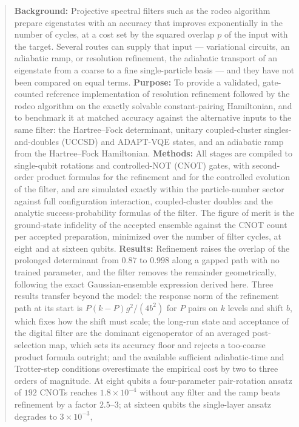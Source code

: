 \documentclass[
  aps,            %
  prc,            %
  reprint,        %
  superscriptaddress,
  floatfix,
  nofootinbib
]{revtex4-2}
\begin{document}
\begin{abstract}
\textbf{Background:} Projective spectral filters such as the rodeo algorithm
prepare eigenstates with an accuracy that improves exponentially in the
number of cycles, at a cost set by the squared overlap $p$ of the input
with the target.  Several routes can supply that input --- variational circuits, an
adiabatic ramp, or resolution refinement, the adiabatic transport of an
eigenstate from a coarse to a fine single-particle basis --- and they have
not been compared on equal terms.
\textbf{Purpose:} To provide a validated, gate-counted reference
implementation of resolution refinement followed by the rodeo algorithm on
the exactly solvable constant-pairing Hamiltonian, and to benchmark it at
matched accuracy against the alternative inputs to the same filter: the
Hartree--Fock determinant, unitary coupled-cluster singles-and-doubles
(UCCSD) and ADAPT-VQE states, and an adiabatic ramp from the Hartree--Fock
Hamiltonian.
\textbf{Methods:} All stages are compiled to single-qubit rotations and
controlled-NOT (CNOT) gates, with second-order product formulas for the
refinement and for the controlled evolution of the filter, and are simulated
exactly within the particle-number sector against full configuration
interaction, coupled-cluster doubles and the analytic success-probability
formulas of the filter.  The figure of merit is the
ground-state infidelity of the accepted ensemble against the CNOT count per
accepted preparation, minimized over the number of filter cycles, at eight
and at sixteen qubits.
\textbf{Results:} Refinement raises the overlap of the prolonged determinant from $0.87$ to
$0.998$ along a gapped path with no trained parameter, and the filter
removes the remainder geometrically, following the exact Gaussian-ensemble
expression derived here.  Three results transfer beyond the model: the response norm of the
refinement path at its start is $P(k-P)g^2/(4b^2)$ for $P$ pairs on $k$
levels and shift $b$, which fixes how the shift must scale; the long-run state and acceptance of the digital filter are the
dominant eigenoperator of an averaged post-selection map, which sets its
accuracy floor and rejects a too-coarse product formula outright; and the
available sufficient adiabatic-time and Trotter-step conditions overestimate
the empirical cost by two to three orders of magnitude.  At eight qubits a four-parameter pair-rotation ansatz
of $192$ CNOTs reaches $1.8\times10^{-4}$ without any filter and the ramp
beats refinement by a factor $2.5$--$3$;
at sixteen qubits the single-layer ansatz degrades to $3\times10^{-3}$,

\end{abstract}
\end{document}

